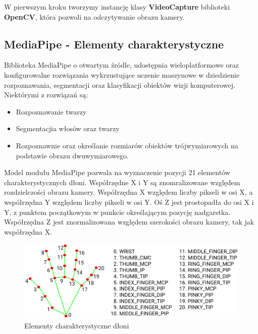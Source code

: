\quad W pierwszym kroku tworzymy instancję klasy \textbf{VideoCapture} biblioteki \textbf{OpenCV}, która pozwoli na odczytywanie obrazu kamery. 





\subsection{MediaPipe - Elementy charakterystyczne}

\quad Biblioteka MediaPipe o otwartym źródle, udostępnia wieloplatformowe oraz konfigurowalne rozwiązania wykrzustujące uczenie maszynowe w dziedzienie rozpoznawania, segmentacji oraz klasyfikacji obiektów wizji komputerowej. Niektórymi z rozwiązań są:

\begin{itemize}
    \item Rozpoznawanie twarzy
    \item Segmentacjia włosów oraz twarzy
    \item Rozpoznawnie oraz określanie rozmiarów obiektów trójwymiarowych 
          na podstawie obrazu dwuwymiarowego. 
\end{itemize}

\quad Model modułu MediaPipe pozwala na wyznaczenie pozycji 21 elementów charakterystycznych dłoni. Współrzędne X i Y są znomralizowane względem rozdzielczości obrazu kamery. Współrzędna X względem liczby pikseli w osi X, a współrzędna Y względem liczby pikseli w osi Y. Oś Z jest prostopadła do osi X i Y, z punktem początkowym w punkcie określającym pozycję nadgarstka. Współrzędna Z jest znormalizowana względem szerokości obrazu kamery, tak jak współrzędna X. 

\begin{figure}[H]
\begin{center}
    \includegraphics[width=15cm]{../images/hand_landmarks.png}
    \caption{Elementy charakterystyczne dłoni}
\end{center}
\end{figure}

